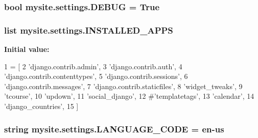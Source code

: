 \subsubsection[{\texorpdfstring{D\+E\+B\+UG}{DEBUG}}]{\setlength{\rightskip}{0pt plus 5cm}bool mysite.\+settings.\+D\+E\+B\+UG = True}\hypertarget{namespacemysite_1_1settings_af3cd9446472cd1e91fa265ae8440b2a1}{}\label{namespacemysite_1_1settings_af3cd9446472cd1e91fa265ae8440b2a1}
\subsubsection[{\texorpdfstring{I\+N\+S\+T\+A\+L\+L\+E\+D\+\_\+\+A\+P\+PS}{INSTALLED_APPS}}]{\setlength{\rightskip}{0pt plus 5cm}list mysite.\+settings.\+I\+N\+S\+T\+A\+L\+L\+E\+D\+\_\+\+A\+P\+PS}\hypertarget{namespacemysite_1_1settings_ae0300504ffe212a8082806286d6fe36b}{}\label{namespacemysite_1_1settings_ae0300504ffe212a8082806286d6fe36b}
{\bfseries Initial value\+:}
\begin{DoxyCode}
1 = [
2     \textcolor{stringliteral}{'django.contrib.admin'},
3     \textcolor{stringliteral}{'django.contrib.auth'},
4     \textcolor{stringliteral}{'django.contrib.contenttypes'},
5     \textcolor{stringliteral}{'django.contrib.sessions'},
6     \textcolor{stringliteral}{'django.contrib.messages'},
7     \textcolor{stringliteral}{'django.contrib.staticfiles'},
8     \textcolor{stringliteral}{'widget\_tweaks'},
9     \textcolor{stringliteral}{'tcourse'},
10     \textcolor{stringliteral}{'updown'},
11     \textcolor{stringliteral}{'social\_django'},
12     \textcolor{comment}{#'templatetags',}
13     \textcolor{stringliteral}{'calendar'},
14     \textcolor{stringliteral}{'django\_countries'},
15 ]
\end{DoxyCode}
\subsubsection[{\texorpdfstring{L\+A\+N\+G\+U\+A\+G\+E\+\_\+\+C\+O\+DE}{LANGUAGE_CODE}}]{\setlength{\rightskip}{0pt plus 5cm}string mysite.\+settings.\+L\+A\+N\+G\+U\+A\+G\+E\+\_\+\+C\+O\+DE = \textquotesingle{}en-\/us\textquotesingle{}}\hypertarget{namespacemysite_1_1settings_a5aa2d89c65baaf7b41e64a82ed412029}{}\label{namespacemysite_1_1settings_a5aa2d89c65baaf7b41e64a82ed412029}
